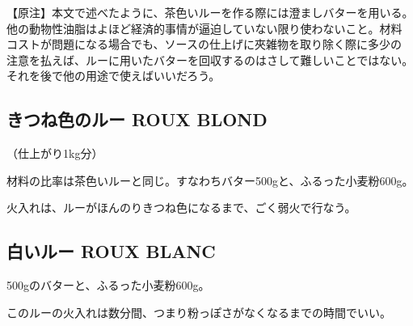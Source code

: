 \documentclass[twoside,12Q,b5paper]{escoffierltjsbook}
\begin{document}
【原注】本文で述べたように、茶色いルーを作る際には澄ましバターを用いる。
他の動物性油脂はよほど経済的事情が逼迫していない限り使わないこと。材料
コストが問題になる場合でも、ソースの仕上げに夾雑物を取り除く際に多少の
注意を払えば、ルーに用いたバターを回収するのはさして難しいことではない。
それを後で他の用途で使えばいいだろう。

\subsection*{きつね色のルー ROUX
BLOND}\label{ux304dux3064ux306dux8272ux306eux30ebux30fc-roux-blond}

（仕上がり1kg分）

材料の比率は茶色いルーと同じ。すなわちバター500gと、ふるった小麦粉600g。

火入れは、ルーがほんのりきつね色になるまで、ごく弱火で行なう。

\subsection*{白いルー ROUX
BLANC}\label{ux767dux3044ux30ebux30fc-roux-blanc}

500gのバターと、ふるった小麦粉600g。

このルーの火入れは数分間、つまり粉っぽさがなくなるまでの時間でいい。




\end{document}
